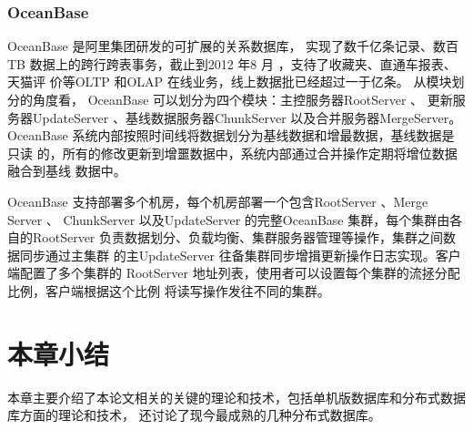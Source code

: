 \subsubsection{OceanBase}
OceanBase 是阿里集团研发的可扩展的关系数据库，
实现了数千亿条记录、数百
TB 数据上的跨行跨表事务，截止到2012 年8 月
，支待了收藏夹、直通车报表、天猫评
价等OLTP 和OLAP 在线业务，线上数据批已经超过一于亿条。
从模块划分的角度看， OceanBase 可以划分为四个模块：主控服务器RootServer 、
更新服务器UpdateServer 
、基线数据服务器ChunkServer 以及合并服务器MergeServer。
OceanBase 系统内部按照时间线将数据划分为基线数据和增最数据，基线数据是只读
的，所有的修改更新到增噩数据中，系统内部通过合并操作定期将增位数据融合到基线
数据中。

OceanBase 支持部署多个机房，每个机房部署一个包含RootServer 、Merge Server 、
ChunkServer 以及UpdateServer 的完整OceanBase 集群，每个集群由各自的RootServer
负责数据划分、负载均衡、集群服务器管理等操作，集群之间数据同步通过主集群
的主UpdateServer 往备集群同步增揖更新操作日志实现。客户端配置了多个集群的
RootServer 地址列表，使用者可以设置每个集群的流拯分配比例，客户端根据这个比例
将读写操作发往不同的集群。
\section{本章小结}
本章主要介绍了本论文相关的关键的理论和技术，包括单机版数据库和分布式数据库方面的理论和技术，
还讨论了现今最成熟的几种分布式数据库。
